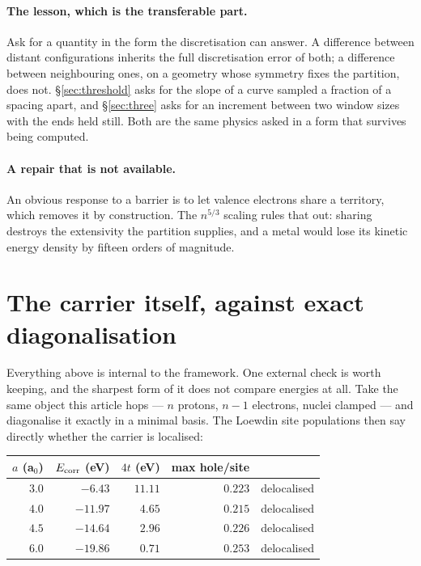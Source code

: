 \documentclass[11pt]{article}
\begin{document}
\paragraph{The lesson, which is the transferable part.} Ask for a quantity in the form the
discretisation can answer. A difference between distant configurations inherits the full
discretisation error of both; a difference between neighbouring ones, on a geometry whose symmetry
fixes the partition, does not. \S\ref{sec:threshold} asks for the slope of a curve sampled a fraction
of a spacing apart, and \S\ref{sec:three} asks for an increment between two window sizes with the
ends held still. Both are the same physics asked in a form that survives being computed.

\paragraph{A repair that is not available.} An obvious response to a barrier is to let valence
electrons share a territory, which removes it by construction. The $n^{5/3}$ scaling rules that out:
sharing destroys the extensivity the partition supplies, and a metal would lose its kinetic energy
density by fifteen orders of magnitude.

\section{The carrier itself, against exact diagonalisation}\label{sec:stdqm}

Everything above is internal to the framework. One external check is worth keeping, and the sharpest
form of it does not compare energies at all. Take the same object this article hops --- $n$ protons,
$n-1$ electrons, nuclei clamped --- and diagonalise it exactly in a minimal basis. The Loewdin site
populations then say directly whether the carrier is localised:

\begin{center}
\small
\begin{tabular}{@{}rrrrl@{}}
\toprule
$a$ (a$_0$) & $E_{\rm corr}$ (eV) & $4t$ (eV) & max hole/site & \\
\midrule
$3.0$ & $-6.43$ & $11.11$ & $0.223$ & delocalised\\
$4.0$ & $-11.97$ & $4.65$ & $0.215$ & delocalised\\
$4.5$ & $-14.64$ & $2.96$ & $0.226$ & delocalised\\
$6.0$ & $-19.86$ & $0.71$ & $0.253$ & delocalised\\
\bottomrule
\end{tabular}
\end{center}
\end{document}
